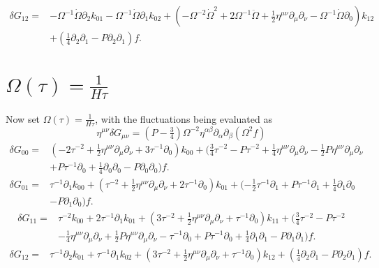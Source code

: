 \documentclass[10pt,letterpaper]{article}
\begin{document}
\begin{align}
\delta G_{12}={}&- \Omega^{-1} \dot{\Omega} \partial_{2} k_{01}
 -  \Omega^{-1} \dot{\Omega} \partial_{1} k_{02}
 + (- \Omega^{-2} \dot{\Omega}^2
 + 2 \Omega^{-1} \ddot{\Omega}
 + \tfrac{1}{2} \eta^{\mu \nu} \partial_{\mu} \partial_{\nu}
 -  \Omega^{-1} \dot{\Omega} \partial_{0}) k_{12}\nonumber\\
& + (\tfrac{1}{4} \partial_{2} \partial_{1}
 -  P \partial_{2} \partial_{1}) f.
\end{align}
\section*{$\Omega(\tau)=\tfrac{1}{H\tau}$}
Now set $\Omega(\tau) = \frac{1}{H\tau}$, with the fluctuations being evaluated as
\begin{equation}
\eta^{\mu\nu}\delta G_{\mu\nu} =(P-\tfrac34) \Omega^{-2}\eta^{\alpha\beta}\partial_\alpha\partial_\beta (\Omega^{2} f)
\end{equation}
\begin{align}
\delta G_{00}={}&(-2 \tau^{-2}
 + \tfrac{1}{2} \eta^{\mu \nu} \partial_{\mu} \partial_{\nu}
 + 3 \tau^{-1} \partial_{0}) k_{00}
 + (\tfrac{3}{4} \tau^{-2}
 -  P \tau^{-2}
 + \tfrac{1}{4} \eta^{\mu \nu} \partial_{\mu} \partial_{\nu}
 -  \tfrac{1}{2} P \eta^{\mu \nu} \partial_{\mu} \partial_{\nu}\nonumber\\
& + P \tau^{-1} \partial_{0}
 + \tfrac{1}{4} \partial_{0} \partial_{0}
 -  P \partial_{0} \partial_{0}) f.
\end{align}
\begin{align}
\delta G_{01}={}&\tau^{-1} \partial_{1} k_{00}
 + (\tau^{-2}
 + \tfrac{1}{2} \eta^{\mu \nu} \partial_{\mu} \partial_{\nu}
 + 2 \tau^{-1} \partial_{0}) k_{01}
 + (- \tfrac{1}{2} \tau^{-1} \partial_{1}
 + P \tau^{-1} \partial_{1}
 + \tfrac{1}{4} \partial_{1} \partial_{0}\nonumber\\
& -  P \partial_{1} \partial_{0}) f.
\end{align}
\begin{align}
\delta G_{11}={}&\tau^{-2} k_{00}
 + 2 \tau^{-1} \partial_{1} k_{01}
 + (3 \tau^{-2}
 + \tfrac{1}{2} \eta^{\mu \nu} \partial_{\mu} \partial_{\nu}
 + \tau^{-1} \partial_{0}) k_{11}
 + (\tfrac{3}{4} \tau^{-2}
 -  P \tau^{-2}\nonumber\\
& -  \tfrac{1}{4} \eta^{\mu \nu} \partial_{\mu} \partial_{\nu}
 + \tfrac{1}{2} P \eta^{\mu \nu} \partial_{\mu} \partial_{\nu}
 -  \tau^{-1} \partial_{0}
 + P \tau^{-1} \partial_{0}
 + \tfrac{1}{4} \partial_{1} \partial_{1}
 -  P \partial_{1} \partial_{1}) f.
\end{align}
\begin{align}
\delta G_{12}={}&\tau^{-1} \partial_{2} k_{01}
 + \tau^{-1} \partial_{1} k_{02}
 + (3 \tau^{-2}
 + \tfrac{1}{2} \eta^{\mu \nu} \partial_{\mu} \partial_{\nu}
 + \tau^{-1} \partial_{0}) k_{12}
 + (\tfrac{1}{4} \partial_{2} \partial_{1}
 -  P \partial_{2} \partial_{1}) f.
\end{align}
\end{document}
